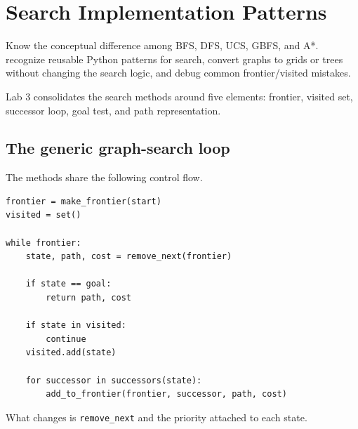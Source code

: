 \chapter{Search Implementation Patterns}
\label{ch:searchpatterns}

\chapterguide%
  {Know the conceptual difference among BFS, DFS, UCS, GBFS, and A*.}
  {recognize reusable Python patterns for search, convert graphs to grids or trees without changing the search logic, and debug common frontier/visited mistakes.}

Lab 3 consolidates the search methods around five elements: frontier, visited set, successor loop, goal test, and path representation.

\section{The generic graph-search loop}

The methods share the following control flow.

\begin{lstlisting}[style=mlpython]
frontier = make_frontier(start)
visited = set()

while frontier:
    state, path, cost = remove_next(frontier)

    if state == goal:
        return path, cost

    if state in visited:
        continue
    visited.add(state)

    for successor in successors(state):
        add_to_frontier(frontier, successor, path, cost)
\end{lstlisting}

What changes is \texttt{remove\_next} and the priority attached to each state.

\begin{mlfigure}
\end{mlfigure}

